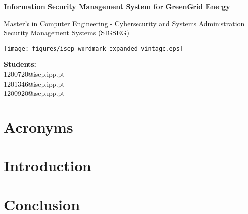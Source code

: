 \documentclass[a4paper,12pt]{report}
\begin{document}
\begin{titlepage}
    \centering
    \vspace*{1.5cm}
    
    \Huge
    \textbf{Information Security Management System for GreenGrid Energy}
    
    \vspace{0.5cm}
    \Large
    Master's in Computer Engineering - Cybersecurity and Systems Administration \\
    Security Management Systems (SIGSEG)
    
    \vspace{1.5cm}
    
    \vfill

    \texttt{[image: figures/isep\_wordmark\_expanded\_vintage.eps]}
    
    \vfill
   
    \textbf{Students:} \\
    1200720@isep.ipp.pt \\
    1201346@isep.ipp.pt \\
    1200920@isep.ipp.pt

    \vfill
\end{titlepage}

\tableofcontents
\newpage
\listoffigures
\chapter*{Acronyms}
\begin{acronym}[XXXX] %

\end{acronym}

\newpage
{}

\chapter{Introduction}



\chapter{Conclusion}



\end{document}
